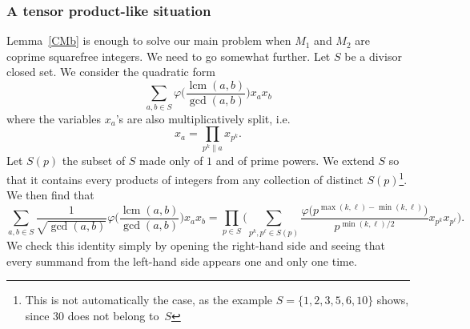 \documentclass[a4paper,12pt, reqn0]{amsart}
\theoremstyle{remark}
\DeclareMathOperator{\lcm}{lcm}
\begin{document}
\subsubsection*{A tensor product-like situation}
Lemma~\ref{CMb} is enough to solve our main problem when $M_1$ and
$M_2$ are coprime squarefree integers. We need to go somewhat further. Let $S$ be a
divisor closed set. We consider the quadratic form
\begin{equation}
  \label{Q1}
  \sum_{a,b\in S}\varphi\biggl(\frac{\lcm(a,b)}{\gcd(a,b)}\biggr)x_a x_b
\end{equation}
where the variables $x_a$'s are also multiplicatively split, i.e.
\begin{equation}
  \label{V1}
  x_a=\prod_{p^k\|a}x_{p^k}.
\end{equation}
Let $S(p)$ the subset of $S$ made only of $1$ and of prime powers. We
extend $S$ so that it contains every products of integers from
any collection of distinct $S(p)$\footnote{This is not automatically
  the case, as the example $S=\{1,2,3,5,6,10\}$ shows, since $30$ does
not belong to~$S$}.
We then find that
\begin{equation}
  \label{Qfactored}
  \sum_{a,b\in S}\frac{1}{\sqrt{\gcd(a,b)}}
  \varphi\biggl(\frac{\lcm(a,b)}{\gcd(a,b)}\biggr)x_a x_b
  =\prod_{p\in S}\biggl(
  \sum_{p^{k},p^\ell\in S(p)}
  \frac{\varphi\bigl(p^{\max(k,\ell)-\min(k,\ell)}\bigr)}{p^{\min(k,\ell)/2}}
  x_{p^k} x_{p^\ell}
  \biggr).
\end{equation}
We check this identity simply by opening the right-hand side and
seeing that every summand from the left-hand side appears one and only
one time. 


\end{document}
